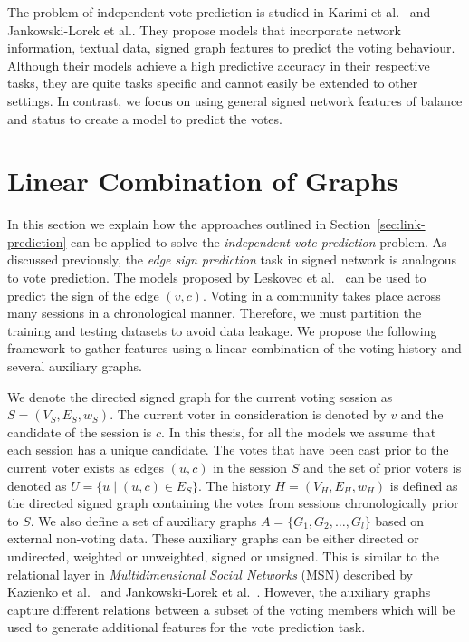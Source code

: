 The problem of independent vote prediction is studied in Karimi et al.\ \cite{karimi2019multicongress} and Jankowski-Lorek et al.\cite{jankowski-lorek2013MBSN}. They propose models that incorporate network information, textual data, signed graph features to predict the voting behaviour. Although their models achieve a high predictive accuracy in their respective tasks, they are quite tasks specific and cannot easily be extended to other settings. In contrast, we focus on using general signed network features of balance and status to create a model to predict the votes. 

\fi

\section{Linear Combination of Graphs}
\label{sec:linear-combination-theory}

In this section we explain how the approaches outlined in Section~\ref{sec:link-prediction} can be applied to solve the \textit{independent vote prediction} problem. As discussed previously, the \textit{edge sign prediction} task in signed network is analogous to vote prediction. The models proposed by Leskovec et al.\ \cite{leskovec2010predicting} can be used to predict the sign of the edge $(v,c)$. Voting in a community takes place across many sessions in a chronological manner. Therefore, we must partition the training and testing datasets to avoid data leakage. We propose the following framework to gather features using a linear combination of the voting history and several auxiliary graphs.

We denote the directed signed graph for the current voting session as $S=(V_S,E_S,w_S)$. The current voter in consideration is denoted by $v$ and the candidate of the session is $c$. In this thesis, for all the models we assume that each session has a unique candidate. The votes that have been cast prior to the current voter exists as edges $(u,c)$ in the session $S$ and the set of prior voters is denoted as $U =\{u \mid (u,c) \in E_S\}$. The history $H=(V_H,E_H,w_H)$ is defined as the directed signed graph containing the votes from sessions chronologically prior to $S$. We also define a set of auxiliary graphs $A = \{G_1,G_2,\dots,G_l\}$ based on external non-voting data. These auxiliary graphs can be either directed or undirected, weighted or unweighted, signed or unsigned. This is similar to the relational layer in \textit{Multidimensional Social Networks} (MSN) described by Kazienko et al.\ \cite{kazienko2011multidimensional} and Jankowski-Lorek et al.\ \cite{jankowski-lorek2013MBSN}. However, the auxiliary graphs capture different relations between a subset of the voting members which will be used to generate additional features for the vote prediction task. 

